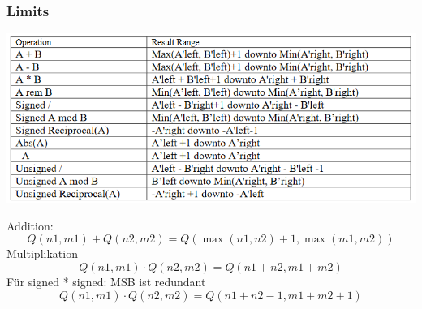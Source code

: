 \subsubsection{Limits}
\begin{center}
	\includegraphics[width=\columnwidth]{Images/limits}
\end{center}

Addition:
\[
Q(n1,m1) + Q(n2,m2) = Q(\max(n1, n2) + 1, \max(m1, m2))
\]
Multiplikation
\[
Q(n1,m1) \cdot Q(n2,m2) = Q(n1 + n2, m1 + m2)
\]
Für signed * signed: MSB ist redundant
\[
Q(n1,m1) \cdot Q(n2,m2) = Q(n1 + n2 -1, m1 + m2+1)
\]